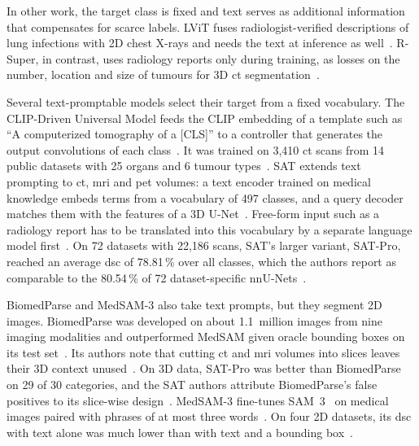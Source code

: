 In other work, the target class is fixed and text serves as additional information that compensates for scarce labels.
LViT fuses radiologist-verified descriptions of lung infections with 2D chest X-rays and needs the text at inference as well~\cite{li2023lvitlanguagemeetsvision}.
R-Super, in contrast, uses radiology reports only during training, as losses on the number, location and size of tumours for 3D \gls{ct} segmentation~\cite{bassi2025learningsegmentationradiologyreports}.

Several text-promptable models select their target from a fixed vocabulary.
The CLIP-Driven Universal Model feeds the CLIP embedding of a template such as ``A computerized tomography of a [CLS]'' to a controller that generates the output convolutions of each class~\cite{Liu_2023}.
It was trained on 3{,}410 \gls{ct} scans from 14 public datasets with 25 organs and 6 tumour types~\cite{Liu_2023}.
SAT extends text prompting to \gls{ct}, \gls{mri} and \gls{pet} volumes: a text encoder trained on medical knowledge embeds terms from a vocabulary of 497 classes, and a query decoder matches them with the features of a 3D U-Net~\cite{zhao2025sat}.
Free-form input such as a radiology report has to be translated into this vocabulary by a separate language model first~\cite{zhao2025sat}.
On 72 datasets with 22{,}186 scans, SAT's larger variant, SAT-Pro, reached an average \gls{dsc} of 78.81\,\% over all classes, which the authors report as comparable to the 80.54\,\% of 72 dataset-specific nnU-Nets~\cite{zhao2025sat}.

BiomedParse and MedSAM-3 also take text prompts, but they segment 2D images.
BiomedParse was developed on about 1.1~million images from nine imaging modalities and outperformed MedSAM given oracle bounding boxes on its test set~\cite{zhao2025foundation-9de}.
Its authors note that cutting \gls{ct} and \gls{mri} volumes into slices leaves their 3D context unused~\cite{zhao2025foundation-9de}.
On 3D data, SAT-Pro was better than BiomedParse on 29 of 30 categories, and the SAT authors attribute BiomedParse's false positives to its slice-wise design~\cite{zhao2025sat}.
MedSAM-3 fine-tunes SAM~3~\cite{carion2026sam3segmentconcepts} on medical images paired with phrases of at most three words~\cite{liu2026medsam3delvingsegmentmedical}.
On four 2D datasets, its \gls{dsc} with text alone was much lower than with text and a bounding box~\cite{liu2026medsam3delvingsegmentmedical}.

